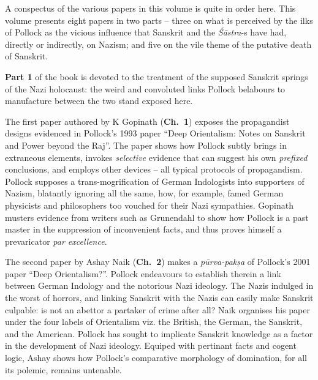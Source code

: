 A conspectus of the various papers in this volume is quite in order here. This volume presents eight papers in two parts – three on what is perceived by the ilks of Pollock as the vicious influence that Sanskrit and the {\sl Śāstra}-s have had, directly or indirectly, on Nazism; and five on the vile theme of the putative death of Sanskrit.

{\bf Part 1} of the book is devoted to the treatment of the supposed Sanskrit springs of the Nazi holocaust: the weird and convoluted links Pollock belabours to manufacture between the two stand exposed here. 

The first paper authored by K Gopinath ({\bf Ch.\ 1}) exposes the propagandist designs evidenced in Pollock’s 1993 paper “Deep Orientalism: Notes on Sanskrit and Power beyond the Raj”. The paper shows how Pollock subtly brings in extraneous elements, invokes {\sl selective} evidence that can suggest his own {\sl prefixed} conclusions, and employs other devices – all typical protocols of  propagandism.  Pollock supposes a trans-mogrification of German Indologists into supporters of Nazism, blatantly ignoring all the same, how, for example, famed German physicists and philosophers too vouched for their Nazi sympathies. Gopinath musters evidence from writers such as Grunendahl to show how Pollock is a past master in the suppression of inconvenient facts, and thus proves himself a prevaricator {\sl par excellence}.

The second paper by Ashay Naik ({\bf Ch.~2}) makes a {\sl pūrva-pakṣa} of Pollock’s 2001 paper “Deep Orientalism?”. Pollock endeavours to establish therein a link between German Indology and the notorious Nazi ideology. The Nazis indulged in the worst of horrors, and linking Sanskrit with the Nazis can easily make Sanskrit culpable: is not an abettor a partaker of crime after all? Naik organises his paper under the four labels of Orientalism viz. the British, the German, the Sanskrit, and the American. Pollock has sought to implicate Sanskrit knowledge as a factor in the development of Nazi ideology. Equiped with pertinant facts and cogent logic, Ashay shows how Pollock’s comparative morphology of domination, for all its polemic, remains untenable.

